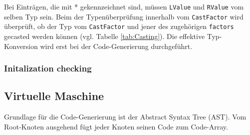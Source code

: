 \documentclass[10pt, a4paper, twocolumn]{article} %
\begin{document}
\begin{table}[h]
    \centering
    \tiny
    \caption{Erlaubte Typen}
    \label{tab:types}
\end{table}
Bei Einträgen, die mit * gekennzeichnet sind, müssen \texttt{LValue} und \texttt{RValue} vom selben Typ sein.
Beim der Typenüberprüfung innerhalb vom \texttt{CastFactor} wird überprüft, ob der Typ vom \texttt{CastFactor} und jener des zugehörigen \texttt{factors} gecasted werden können (vgl. Tabelle \ref{tab:Casting}).
Die effektive Typ-Konversion wird erst bei der Code-Generierung durchgeführt.

\subsubsection*{Initalization checking}

\subsection{Virtuelle Maschine}
Grundlage für die Code-Generierung ist der Abstract Syntax Tree (AST).
Vom Root-Knoten ausgehend fügt jeder Knoten seinen Code zum Code-Array.
\end{document}
